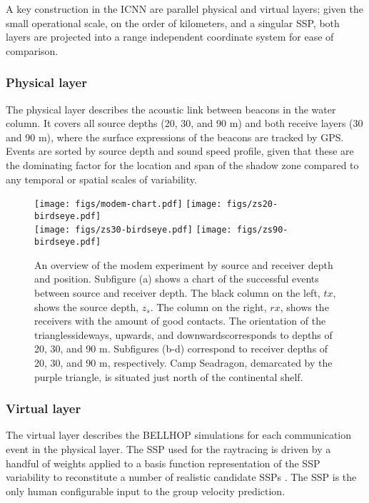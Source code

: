 A key construction in the ICNN are parallel physical and virtual layers; given the small operational scale, on the order of kilometers, and a singular SSP, both layers are projected into a range independent coordinate system for ease of comparison.

\subsubsection{Physical layer}
The physical layer describes the acoustic link between beacons in the water column.
It covers all source depths (20, 30, and 90 m) and both receive layers (30 and 90 m), where the surface expressions of the beacons are tracked by GPS.
Events are sorted by source depth and sound speed profile, given that these are the dominating factor for the location and span of the shadow zone compared to any temporal or spatial scales of variability.


\begin{figure}[h!]
  \centering
  \texttt{[image: figs/modem-chart.pdf]} \hfill
  \texttt{[image: figs/zs20-birdseye.pdf]} \\
  \vspace{1em}
  \texttt{[image: figs/zs30-birdseye.pdf]} \hfill
  \texttt{[image: figs/zs90-birdseye.pdf]} \\
  \caption{An overview of the modem experiment by source and receiver depth and position. Subfigure (a) shows a chart of the successful events between source and receiver depth. The black column on the left, $tx$, shows the source depth, $z_s$. The column on the right, $rx$, shows the receivers with the amount of good contacts. The orientation of the triangles\textemdash sideways, upwards, and downwards\textemdash corresponds to depths of 20, 30, and 90 m. Subfigures (b-d) correspond to receiver depths of 20, 30, and 90 m, respectively. Camp Seadragon, demarcated by the purple triangle, is situated just north of the continental shelf.}
  \label{fig:overview}
  \end{figure}

\clearpage

\subsubsection{Virtual layer}
The virtual layer describes the BELLHOP simulations for each communication event in the physical layer.
The SSP used for the raytracing is driven by a handful of weights applied to a basis function representation
of the SSP variability to reconstitute a number of realistic candidate SSPs \citep{leblanc_underwater_1980,lin_merging_2010}.
The SSP is the only human configurable input to the group velocity prediction.

